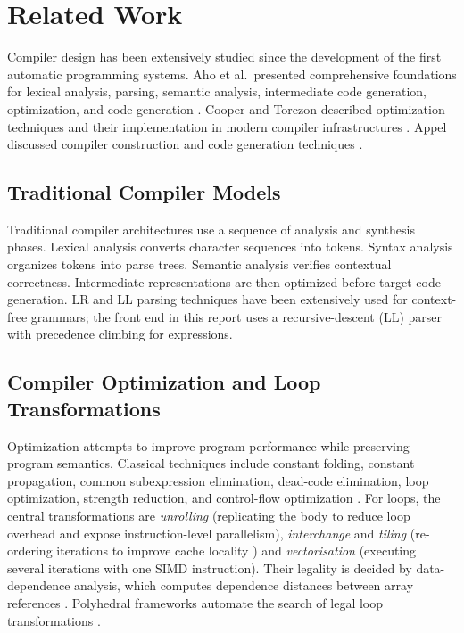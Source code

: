 \documentclass[12pt,a4paper]{article}
\begin{document}
\newpage

\section{Related Work}

Compiler design has been extensively studied since the development of the
first automatic programming systems. Aho et al.\ presented comprehensive
foundations for lexical analysis, parsing, semantic analysis, intermediate
code generation, optimization, and code generation \cite{aho2006}. Cooper and
Torczon described optimization techniques and their implementation in modern
compiler infrastructures \cite{cooper2007}. Appel discussed compiler
construction and code generation techniques \cite{appel2004}.

\subsection{Traditional Compiler Models}

Traditional compiler architectures use a sequence of analysis and
synthesis phases. Lexical analysis converts character sequences into tokens.
Syntax analysis organizes tokens into parse trees. Semantic analysis verifies
contextual correctness. Intermediate representations are then optimized before
target-code generation. LR and LL parsing techniques have been extensively used
for context-free grammars; the front end in this report uses a recursive-descent
(LL) parser with precedence climbing for expressions.

\subsection{Compiler Optimization and Loop Transformations}

Optimization attempts to improve program performance while preserving
program semantics. Classical techniques include constant folding, constant
propagation, common subexpression elimination, dead-code elimination, loop
optimization, strength reduction, and control-flow optimization
\cite{muchnick1997}. For loops, the central transformations are
\emph{unrolling} (replicating the body to reduce loop overhead and expose
instruction-level parallelism), \emph{interchange} and \emph{tiling}
(re-ordering iterations to improve cache locality \cite{wolf1991}) and
\emph{vectorisation} (executing several iterations with one SIMD instruction).
Their legality is decided by data-dependence analysis, which computes
dependence distances between array references \cite{allen2002,bacon1994}.
Polyhedral frameworks automate the search of legal loop transformations
\cite{bondhugula2008}.
\end{document}
